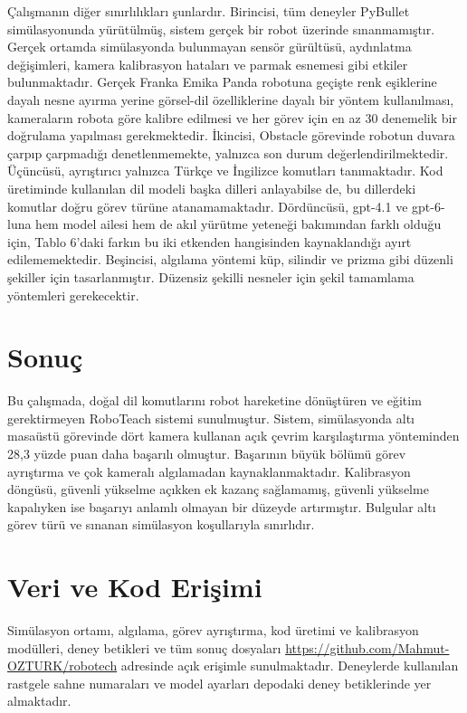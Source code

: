 \documentclass[preprint,12pt]{elsarticle}
\begin{document}
Çalışmanın diğer sınırlılıkları şunlardır. Birincisi, tüm deneyler PyBullet simülasyonunda yürütülmüş, sistem gerçek bir robot üzerinde sınanmamıştır. Gerçek ortamda simülasyonda bulunmayan sensör gürültüsü, aydınlatma değişimleri, kamera kalibrasyon hataları ve parmak esnemesi gibi etkiler bulunmaktadır. Gerçek Franka Emika Panda robotuna geçişte renk eşiklerine dayalı nesne ayırma yerine görsel-dil özelliklerine dayalı bir yöntem \cite{radford2021clip} kullanılması, kameraların robota göre kalibre edilmesi ve her görev için en az 30 denemelik bir doğrulama yapılması gerekmektedir. İkincisi, Obstacle görevinde robotun duvara çarpıp çarpmadığı denetlenmemekte, yalnızca son durum değerlendirilmektedir. Üçüncüsü, ayrıştırıcı yalnızca Türkçe ve İngilizce komutları tanımaktadır. Kod üretiminde kullanılan dil modeli başka dilleri anlayabilse de, bu dillerdeki komutlar doğru görev türüne atanamamaktadır. Dördüncüsü, gpt-4.1 ve gpt-6-luna hem model ailesi hem de akıl yürütme yeteneği bakımından farklı olduğu için, Tablo 6'daki farkın bu iki etkenden hangisinden kaynaklandığı ayırt edilememektedir. Beşincisi, algılama yöntemi küp, silindir ve prizma gibi düzenli şekiller için tasarlanmıştır. Düzensiz şekilli nesneler için şekil tamamlama yöntemleri gerekecektir.

\hypertarget{sonuuxe7}{%
\section{Sonuç}\label{sonuuxe7}}

Bu çalışmada, doğal dil komutlarını robot hareketine dönüştüren ve eğitim gerektirmeyen RoboTeach sistemi sunulmuştur. Sistem, simülasyonda altı masaüstü görevinde dört kamera kullanan açık çevrim karşılaştırma yönteminden 28,3 yüzde puan daha başarılı olmuştur. Başarının büyük bölümü görev ayrıştırma ve çok kameralı algılamadan kaynaklanmaktadır. Kalibrasyon döngüsü, güvenli yükselme açıkken ek kazanç sağlamamış, güvenli yükselme kapalıyken ise başarıyı anlamlı olmayan bir düzeyde artırmıştır. Bulgular altı görev türü ve sınanan simülasyon koşullarıyla sınırlıdır.

\hypertarget{veri-ve-kod-eriux15fimi}{%
\section*{Veri ve Kod Erişimi}\label{veri-ve-kod-eriux15fimi}}

Simülasyon ortamı, algılama, görev ayrıştırma, kod üretimi ve kalibrasyon modülleri, deney betikleri ve tüm sonuç dosyaları \url{https://github.com/Mahmut-OZTURK/robotech} adresinde açık erişimle sunulmaktadır. Deneylerde kullanılan rastgele sahne numaraları ve model ayarları depodaki deney betiklerinde yer almaktadır.
\end{document}
